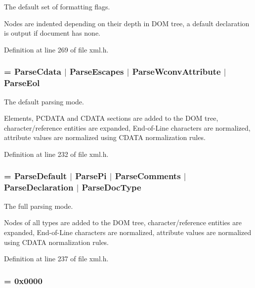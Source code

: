 The default set of formatting flags. 

Nodes are indented depending on their depth in DOM tree, a default declaration is output if document has none. 

Definition at line 269 of file xml.h.

\hypertarget{namespacephys_1_1xml_aa6b8f7f8c2322fd683a235b498834d60}{
\subsubsection[{ParseDefault}]{ = {\bf ParseCdata} $|$ {\bf ParseEscapes} $|$ {\bf ParseWconvAttribute} $|$ {\bf ParseEol}}}
\label{d9/d27/namespacephys_1_1xml_aa6b8f7f8c2322fd683a235b498834d60}


The default parsing mode. 

Elements, PCDATA and CDATA sections are added to the DOM tree, character/reference entities are expanded, End-\/of-\/Line characters are normalized, attribute values are normalized using CDATA normalization rules. 

Definition at line 232 of file xml.h.

\hypertarget{namespacephys_1_1xml_af1c356f1eb063a63efebd6c8a5241c63}{
\subsubsection[{ParseFull}]{ = {\bf ParseDefault} $|$ {\bf ParsePi} $|$ {\bf ParseComments} $|$ {\bf ParseDeclaration} $|$ ParseDocType}}
\label{d9/d27/namespacephys_1_1xml_af1c356f1eb063a63efebd6c8a5241c63}


The full parsing mode. 

Nodes of all types are added to the DOM tree, character/reference entities are expanded, End-\/of-\/Line characters are normalized, attribute values are normalized using CDATA normalization rules. 

Definition at line 237 of file xml.h.

\hypertarget{namespacephys_1_1xml_ab660837afbc6aaab22425d8d23e8f2e4}{
\subsubsection[{ParseMinimal}]{ = 0x0000}}
\label{d9/d27/namespacephys_1_1xml_ab660837afbc6aaab22425d8d23e8f2e4}


